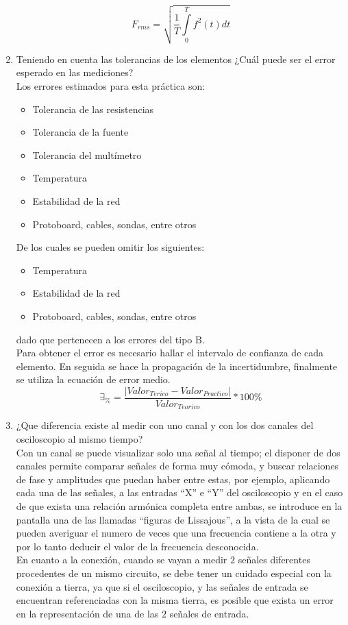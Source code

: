 \documentclass[twocolumn]{IEEEtran}
\begin{document}
\begin{enumerate}
\begin{equation}
{F_{rms}} = \sqrt {\frac{1}{T}\int\limits_0^T {{f^2}\left( t \right)} dt}
\end{equation}
  \item Teniendo en cuenta las tolerancias de los elementos ¿Cuál puede ser el
error esperado en las mediciones?\\
Los errores estimados para esta práctica son:
\begin{itemize}
 \item Tolerancia de las resistencias
 \item Tolerancia de la fuente
 \item Tolerancia del multímetro
 \item Temperatura
 \item Estabilidad de la red
 \item Protoboard, cables, sondas, entre otros
\end{itemize}
\noindent
De los cuales se pueden omitir los siguientes:
\begin{itemize}
 \item Temperatura
 \item Estabilidad de la red
 \item Protoboard, cables, sondas, entre otros
\end{itemize}
\noindent
dado que pertenecen a los errores del tipo B.\\
\noindent
Para obtener el error es necesario hallar el intervalo de confianza  de cada
elemento. En seguida se hace la propagación de la incertidumbre, finalmente se
utiliza la ecuación de error medio.
\begin{equation}
 {\exists _\% } = \frac{{\left| {Valo{r_{Terico}} - Valo{r_{Practico}}}
\right|}}{{Valo{r_{Teorico}}}}*100\% 
\end{equation}
  \item ¿Que diferencia existe al medir con uno canal y con los dos canales del
osciloscopio al mismo tiempo?\\
Con un canal se puede visualizar solo una señal al tiempo; el disponer de dos
canales permite comparar señales de forma muy cómoda, y buscar relaciones de
fase y amplitudes que puedan haber entre estas, por ejemplo, aplicando cada una
de las señales, a las entradas ``X'' e ``Y'' del osciloscopio y en el caso de
que exista una relación armónica completa entre ambas, se introduce en la
pantalla una de las llamadas ``figuras de Lissajous'', a la vista de la cual se
pueden averiguar el numero de veces que una frecuencia contiene a la otra y por
lo tanto deducir el valor de la frecuencia desconocida.\\
En cuanto a la conexión, cuando se vayan a medir $2$ señales diferentes
procedentes de un mismo circuito, se debe tener un cuidado especial con la
conexión a tierra, ya que si el osciloscopio, y las señales de entrada se
encuentran referenciadas con la misma tierra, es posible que exista un error en
la representación de una de las $2$ señales de entrada.
\end{enumerate}
\end{document}
